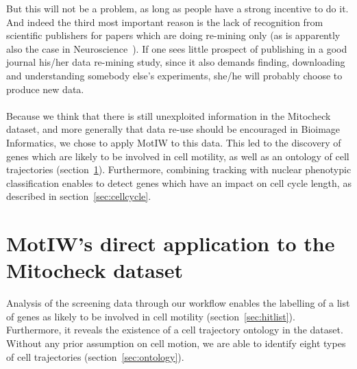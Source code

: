 But this will not be a problem, as long as people have a strong incentive to do it. And indeed the third most important reason is the lack of recognition from scientific publishers for papers which are doing re-mining only (as is apparently also the case in Neuroscience~\cite{pmid24904347}). If one sees little prospect of publishing in a good journal his/her data re-mining study, since it also demands finding, downloading and understanding somebody else's experiments, she/he will probably choose to produce new data.

\paragraph*{}Because we think that there is still unexploited information in the Mitocheck dataset, and more generally that data re-use should be encouraged in Bioimage Informatics, we chose to apply MotIW to this data. This led to the discovery of genes which are likely to be involved in cell motility, as well as an ontology of cell trajectories (section~\ref{sec:mitocheck}). Furthermore, combining tracking with nuclear phenotypic classification enables to detect genes which have an impact on cell cycle length, as described in section~\ref{sec:cellcycle}.

\section{MotIW's direct application to the Mitocheck dataset}
\label{sec:mitocheck}
 Analysis of the screening data through our workflow enables the labelling of a list of genes as likely to be involved in cell motility (section~\ref{sec:hitlist}). Furthermore, it reveals the existence of a cell trajectory ontology in the dataset. Without any prior assumption on cell motion, we are able to identify eight types
of cell trajectories (section~\ref{sec:ontology}).

